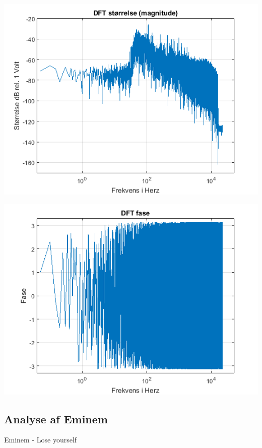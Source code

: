 \documentclass[12pt, letterpaper]{article}
\begin{document}
\begin{center}
\includegraphics[width=\textwidth]{billeder/weekndstorrelse}
\end{center}

\begin{center}
\includegraphics[width=\textwidth]{billeder/weekndfase}
\end{center}

\subsection{Analyse af Eminem}
Eminem - Lose yourself
\end{document}
